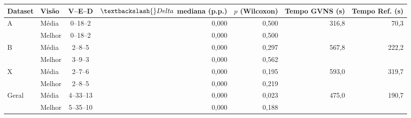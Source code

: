 \small
\begin{tabular}{llcrrrr}
\toprule
Dataset & Visão & V--E--D & $\textbackslash\{\}Delta$ mediana (p.p.) & $p$ (Wilcoxon) & Tempo GVNS (s) & Tempo Ref. (s) \\
\midrule
A & Média & 0--18--2 & 0,000 & 0,500 & 316,8 & 70,3 \\
 & Melhor & 0--18--2 & 0,000 & 0,500 &  &  \\
B & Média & 2--8--5 & 0,000 & 0,297 & 567,8 & 222,2 \\
 & Melhor & 3--9--3 & 0,000 & 0,562 &  &  \\
X & Média & 2--7--6 & 0,000 & 0,195 & 593,0 & 319,7 \\
 & Melhor & 2--8--5 & 0,000 & 0,219 &  &  \\
Geral & Média & 4--33--13 & 0,000 & 0,023 & 475,0 & 190,7 \\
 & Melhor & 5--35--10 & 0,000 & 0,188 &  &  \\
\bottomrule
\end{tabular}

